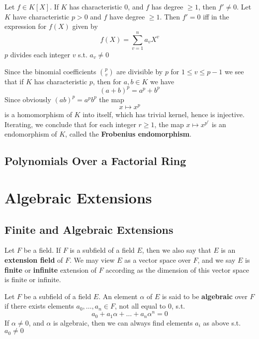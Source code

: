 \documentclass[11pt]{article}
\begin{document}
\begin{proposition}[]
Let \(f\in K[X]\). If \(K\) has characteristic 0, and \(f\) has degree \(\ge 1\), then \(f'\neq 0\).
Let \(K\) have characteristic \(p>0\) and \(f\) have degree \(\ge 1\). Then \(f'=0\) iff in the
expression for \(f(X)\) given by
\begin{equation*}
f(X)=\sum_{v=1}^na_vX^v
\end{equation*}
\(p\) divides each integer \(v\) s.t. \(a_v\neq 0\)
\end{proposition}

Since the binomial coefficients \(\binom{p}{v}\) are divisible by \(p\) for \(1\le v\le p-1\) we see
that if \(K\) has characteristic \(p\), then for \(a,b\in K\) we have
\begin{equation*}
(a+b)^p=a^p+b^p
\end{equation*}
Since obviously \((ab)^p=a^pb^p\) the map
\begin{equation*}
x\mapsto x^p
\end{equation*}
is a homomorphism of \(K\) into itself, which has trivial kernel, hence is injective. Iterating,
we conclude that for each integer \(r\ge 1\), the map \(x\mapsto x^{p^r}\) is an endomorphism of \(K\),
called the \textbf{Frobenius endomorphism}.
\subsection{Polynomials Over a Factorial Ring}
\label{sec:orgf6118ef}

\section{Algebraic Extensions}
\label{sec:orgd1fb4cc}
\subsection{Finite and Algebraic Extensions}
\label{sec:org04334b6}
Let \(F\) be a field. If \(F\) is a subfield of a field \(E\), then we also say that \(E\) is an
\textbf{extension field} of \(F\). We may view \(E\) as a vector space over \(F\), and we say \(E\) is
\textbf{finite} or \textbf{infinite} extension of \(F\) according as the dimension of this vector space is finite
or infinite.

Let \(F\) be a subfield of a field \(E\). An element \(\alpha\) of \(E\) is said to be \textbf{algebraic}
over \(F\) if there exists elements \(a_0,\dots,a_n\in F\), not all equal to 0, s.t.
\begin{equation*}
a_0+a_1\alpha+\dots+a_n\alpha^n=0
\end{equation*}
If \(\alpha\neq 0\), and \(\alpha\) is algebraic, then we can always find elements \(a_i\) as above s.t. \(a_0\neq 0\)
\end{document}
